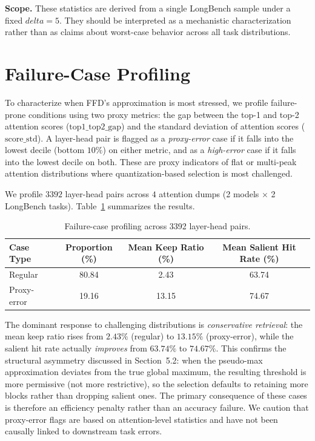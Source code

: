 \documentclass[]{mosi}
\def\delta{delta}%
\theoremstyle{plain}
\theoremstyle{definition}
\theoremstyle{remark}
\begin{document}
\textbf{Scope.} These statistics are derived from a single LongBench sample under a fixed $\delta=5$. They should be interpreted as a mechanistic characterization rather than as claims about worst-case behavior across all task distributions.


\section{Failure-Case Profiling}
\label{app:failure}

To characterize when FFD's approximation is most stressed, we profile failure-prone conditions using two proxy metrics: the gap between the top-1 and top-2 attention scores ($\text{top1\_top2\_gap}$) and the standard deviation of attention scores ($\text{score\_std}$). A layer-head pair is flagged as a \emph{proxy-error} case if it falls into the lowest decile (bottom $10\%$) on either metric, and as a \emph{high-error} case if it falls into the lowest decile on both. These are proxy indicators of flat or multi-peak attention distributions where quantization-based selection is most challenged.

We profile $3392$ layer-head pairs across $4$ attention dumps (2 models $\times$ 2 LongBench tasks). Table~\ref{tab:failure} summarizes the results.

\begin{table}[h]
\caption{Failure-case profiling across 3392 layer-head pairs.}
\label{tab:failure}
\begin{center}
\begin{tabular}{lccc}
\toprule
Case Type & Proportion (\%) & Mean Keep Ratio (\%) & Mean Salient Hit Rate (\%) \\
\midrule
Regular      & 80.84 & 2.43  & 63.74 \\
Proxy-error  & 19.16 & 13.15 & 74.67 \\
\bottomrule
\end{tabular}
\end{center}
\end{table}

The dominant response to challenging distributions is \emph{conservative retrieval}: the mean keep ratio rises from $2.43\%$ (regular) to $13.15\%$ (proxy-error), while the salient hit rate actually \emph{improves} from $63.74\%$ to $74.67\%$. This confirms the structural asymmetry discussed in Section~5.2: when the pseudo-max approximation deviates from the true global maximum, the resulting threshold is more permissive (not more restrictive), so the selection defaults to retaining more blocks rather than dropping salient ones. The primary consequence of these cases is therefore an efficiency penalty rather than an accuracy failure. We caution that proxy-error flags are based on attention-level statistics and have not been causally linked to downstream task errors.
\end{document}
